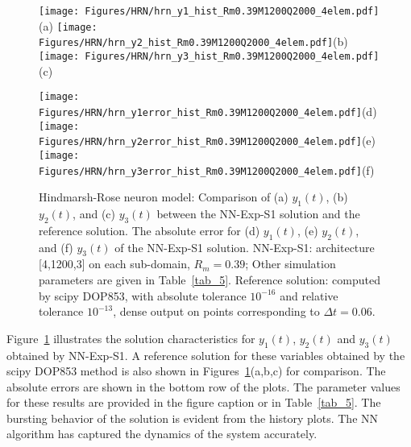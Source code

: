 \begin{figure}
  \centerline{
    \texttt{[image: Figures/HRN/hrn\_y1\_hist\_Rm0.39M1200Q2000\_4elem.pdf]}(a)
    \texttt{[image: Figures/HRN/hrn\_y2\_hist\_Rm0.39M1200Q2000\_4elem.pdf]}(b)
    \texttt{[image: Figures/HRN/hrn\_y3\_hist\_Rm0.39M1200Q2000\_4elem.pdf]}(c)
  }
  \centerline{
    \texttt{[image: Figures/HRN/hrn\_y1error\_hist\_Rm0.39M1200Q2000\_4elem.pdf]}(d)
    \texttt{[image: Figures/HRN/hrn\_y2error\_hist\_Rm0.39M1200Q2000\_4elem.pdf]}(e)
    \texttt{[image: Figures/HRN/hrn\_y3error\_hist\_Rm0.39M1200Q2000\_4elem.pdf]}(f)
  }
  \caption{Hindmarsh-Rose neuron model:
    Comparison of  (a) $y_1(t)$, (b) $y_2(t)$, and (c) $y_3(t)$ between the NN-Exp-S1 solution
    and the reference solution. The absolute error for (d) $y_1(t)$, (e) $y_2(t)$,
    and (f) $y_3(t)$ of the NN-Exp-S1 solution.
    NN-Exp-S1:
    architecture [4,1200,3] on each sub-domain,
    $R_m=0.39$; Other simulation parameters are given in Table~\ref{tab_5}.
    Reference solution: computed by scipy DOP853, with absolute tolerance $10^{-16}$
    and relative tolerance $10^{-13}$, dense output on points corresponding to $\Delta t=0.06$.
  }
  \label{fg_24}
\end{figure}


Figure~\ref{fg_24} illustrates the solution characteristics for $y_1(t)$, $y_2(t)$
and $y_3(t)$ obtained by NN-Exp-S1. 
A reference solution for these variables obtained by the scipy DOP853 method
is also shown in Figures~\ref{fg_24}(a,b,c) for comparison. The
absolute errors  are shown in the bottom row of the plots.
The  parameter values for these results
are provided in the figure caption or in Table~\ref{tab_5}.
The bursting behavior of the solution is evident from the history plots.
The NN algorithm has captured the dynamics of the system accurately.



